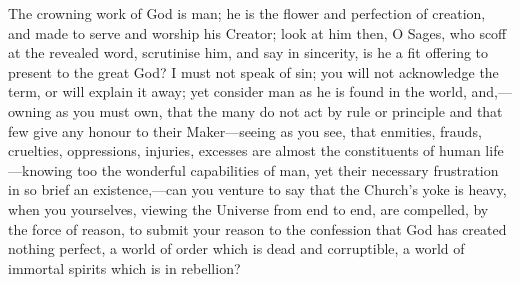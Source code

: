 The crowning work of God is man; he is the flower and perfection of
creation, and made to serve and worship his Creator; look at him then,
O Sages, who scoff at the revealed word, scrutinise him, and say in
sincerity, is he a fit offering to present to the great God? I must
not speak of sin; you will not acknowledge the term, or will explain
it away; yet consider man as he is found in the world, and,—owning
as you must own, that the many do not act by rule or principle and
that few give any honour to their Maker—seeing as you see, that
enmities, frauds, cruelties, oppressions, injuries, excesses are
almost the constituents of human life—knowing too the wonderful
capabilities of man, yet their necessary frustration in so brief an
existence,—can you venture to say that the Church's yoke is heavy,
when you yourselves, viewing the Universe from end to end, are
compelled, by the force of reason, to submit your reason to the
confession that God has created nothing perfect, a world of order
which is dead and corruptible, a world of immortal spirits which is in
rebellion?


